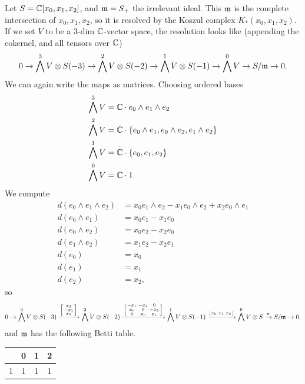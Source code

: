\documentclass[12pt]{article}
\begin{document}
\begin{eg}\label{maximal_ideal}
    Let $S=\mathbb{C}[x_0,x_1,x_2]$, and $\mathfrak{m} = S_+$ the irrelevant ideal. This $\mathfrak{m}$ is the complete intersection of $x_0,x_1,x_2$, so it is resolved by the Koszul complex $K_*(x_0,x_1,x_2)$. If we set $V$ to be a $3$-dim $\mathbb{C}$-vector space, the resolution looks like (appending the cokernel, and all tensors over $\mathbb{C}$)
    \[0 \to \bigwedge^3 V \otimes S(-3) \to \bigwedge^2 V \otimes S(-2) \to \bigwedge^1 V \otimes S(-1) \to \bigwedge^0 V \to S/\mathfrak{m} \to 0.\]
    We can again write the maps as matrices. Choosing ordered bases
    \begin{align*}
        \bigwedge^3 V &= \mathbb{C} \cdot e_0 \wedge e_1 \wedge e_2\\
        \bigwedge^2 V &= \mathbb{C} \cdot \{e_0 \wedge e_1, e_0 \wedge e_2, e_1 \wedge e_2\}\\
        \bigwedge^1 V &= \mathbb{C} \cdot \{e_0, e_1, e_2\}\\
        \bigwedge^0 V &= \mathbb{C} \cdot 1
    \end{align*}
    We compute
    \begin{align*}
        d(e_0\wedge e_1\wedge e_2) &= x_0 e_1\wedge e_2 - x_1 e_0 \wedge e_2 + x_2 e_0 \wedge e_1\\
        d(e_0 \wedge e_1) &= x_0 e_1 - x_1 e_0\\
        d(e_0 \wedge e_2) &= x_0 e_2 - x_2 e_0\\
        d(e_1 \wedge e_2) &= x_1 e_2 - x_2 e_1\\
        d(e_0) &= x_0\\
        d(e_1) &= x_1\\
        d(e_2) &= x_2,
    \end{align*}
    so 
    \[0 \to \bigwedge^3 V \otimes S(-3) \xrightarrow{\begin{bsmallmatrix}
            x_2\\ -x_1\\ x_0
        \end{bsmallmatrix}} \bigwedge^2 V \otimes S(-2) \xrightarrow{\begin{bsmallmatrix}
        -x_1 & -x_2 & 0 \\
        x_0  & 0    & -x_2 \\
        0    & x_0  & x_1
    \end{bsmallmatrix}}
    \bigwedge^1 V \otimes S(-1) \xrightarrow{\begin{bsmallmatrix}
        x_0 & x_1 & x_2
    \end{bsmallmatrix}} \bigwedge^0 V \otimes S \xrightarrow{\pi} S/\mathfrak{m} \to 0,\]
    and $\mathfrak{m}$ has the following Betti table.
    \begin{center}
        \begin{tabular}{c|c c c}
              & 0 & 1 & 2 \\\hline
            1 & 1 & 1 & 1
        \end{tabular}
    \end{center}
\end{eg}
\end{document}
